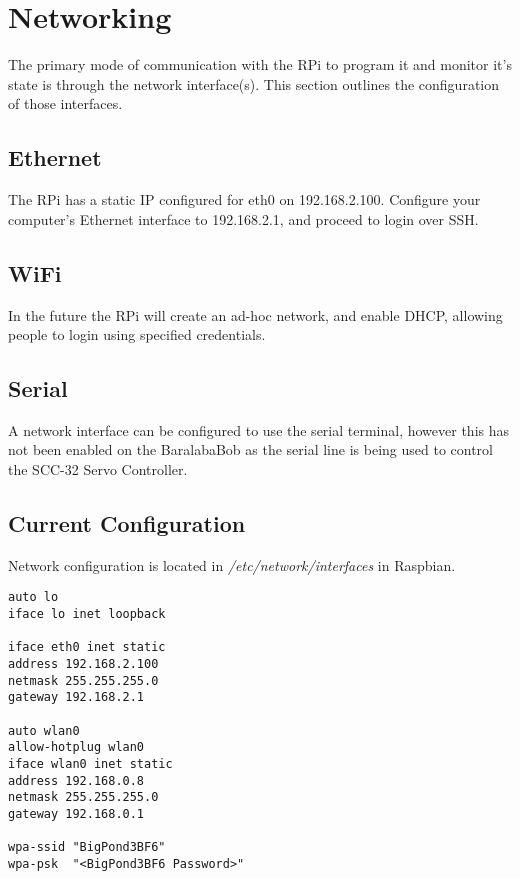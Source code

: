 		
		\section{Networking}
        	\label{rpi_networking}
			The primary mode of communication with the RPi to program it and monitor it's state is through the network interface(s). This section outlines the configuration of those interfaces.
			
			\subsection{Ethernet}
				The RPi has a static IP configured for eth0 on 192.168.2.100. Configure your computer’s Ethernet interface to 192.168.2.1, and proceed to login over SSH.
				
			\subsection{WiFi}
				In the future the RPi will create an ad-hoc network, and enable DHCP, allowing people to login using specified credentials.
				
			\subsection{Serial}
				A network interface can be configured to use the serial terminal, however this has not been enabled on the BaralabaBob as the serial line is being used to control the SCC-32 Servo Controller.
	
			\subsection{Current Configuration}
				Network configuration is located in \emph{/etc/network/interfaces} in Raspbian.\\
			
				\begin{lstlisting}[frame=single]
auto lo
iface lo inet loopback

iface eth0 inet static
address 192.168.2.100
netmask 255.255.255.0
gateway 192.168.2.1

auto wlan0
allow-hotplug wlan0
iface wlan0 inet static
address 192.168.0.8
netmask 255.255.255.0
gateway 192.168.0.1

wpa-ssid "BigPond3BF6"
wpa-psk  "<BigPond3BF6 Password>"
				\end{lstlisting}
				\pagebreak
	
